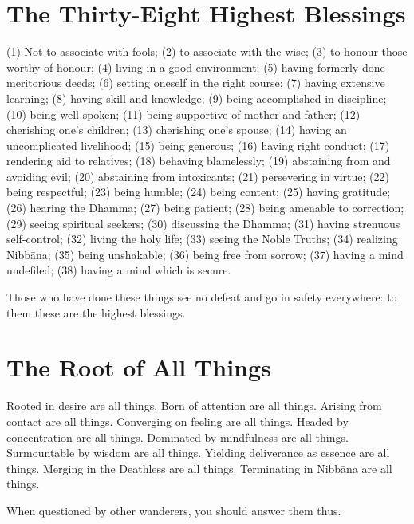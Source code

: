
\ifhandbookedition
\vspace*{-\baselineskip}
\fi

\section*{The Thirty-Eight Highest Blessings}


(1) Not to associate with fools;
(2) to associate with the wise;
(3) to honour those worthy of honour;
(4) living in a good environment;
(5) having formerly done meritorious deeds;
(6) setting oneself in the right course;
(7) having extensive learning;
(8) having skill and knowledge;
(9) being accomplished in discipline;
(10) being well-spoken;
(11) being supportive of mother and father;
(12) cherishing one's children;
(13) cherishing one's spouse;
(14) having an uncomplicated livelihood;
(15) being generous;
(16) having right conduct;
(17) rendering aid to relatives;
(18) behaving blamelessly;
(19) abstaining from and avoiding evil;
(20) abstaining from intoxicants;
(21) persevering in virtue;
(22) being respectful;
(23) being humble;
(24) being content;
(25) having gratitude;
(26) hearing the Dhamma;
(27) being patient;
(28) being amenable to correction;
(29) seeing spiritual seekers;
(30) discussing the Dhamma;
(31) having strenuous self-control;
(32) living the holy life;
(33) seeing the Noble Truths;
(34) realizing Nibbāna;
(35) being unshakable;
(36) being free from sorrow;
(37) having a mind undefiled;
(38) having a mind which is secure.

Those who have done these things see no defeat and go in safety everywhere: to
them these are the highest blessings.


\ifhandbookedition
\vspace*{-\baselineskip}
\fi

\section*{The Root of All Things}

Rooted in desire are all things.
Born of attention are all things.
Arising from contact are all things.
Converging on feeling are all things.
Headed by concentration are all things.
Dominated by mindfulness are all things.
Surmountable by wisdom are all things.
Yielding deliverance as essence are all things.
Merging in the Deathless are all things.
Terminating in Nibbāna are all things.

When questioned by other wanderers, you should answer them thus.


